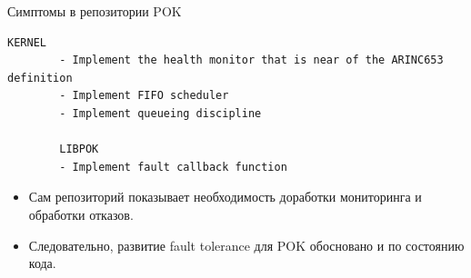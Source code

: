\begin{frame}[fragile]{Симптомы в репозитории POK}
	\begin{lstlisting}[breaklines=true, breakatwhitespace=true]
		KERNEL
		- Implement the health monitor that is near of the ARINC653 definition
		- Implement FIFO scheduler
		- Implement queueing discipline
		
		LIBPOK
		- Implement fault callback function
	\end{lstlisting}
	\vspace{0.3cm}
	\begin{itemize}
		\item Сам репозиторий показывает необходимость доработки мониторинга и обработки отказов.
		\item Следовательно, развитие fault tolerance для POK обосновано и по состоянию кода.
	\end{itemize}
\end{frame}